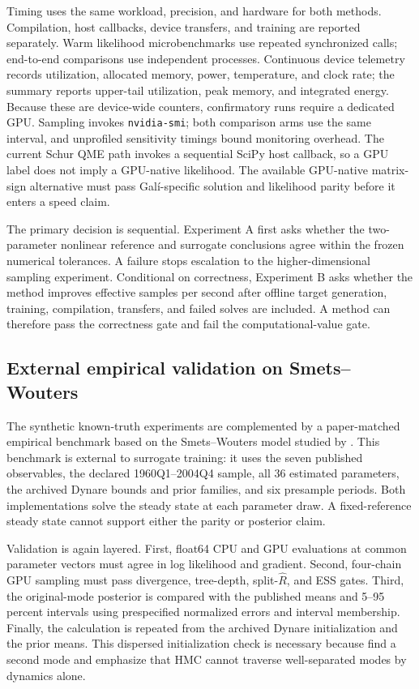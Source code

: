 \documentclass[11pt]{article}
\begin{document}
Timing uses the same workload, precision, and hardware for both methods.
Compilation, host callbacks, device transfers, and training are reported
separately. Warm likelihood microbenchmarks use repeated synchronized calls;
end-to-end comparisons use independent processes. Continuous device telemetry
records utilization, allocated memory, power, temperature, and clock rate; the
summary reports upper-tail utilization, peak memory, and integrated energy.
Because these are device-wide counters, confirmatory runs require a dedicated
GPU. Sampling invokes \texttt{nvidia-smi}; both comparison arms use the same
interval, and unprofiled sensitivity timings bound monitoring overhead. The
current Schur QME path
invokes a sequential SciPy host callback, so a GPU label does not imply a
GPU-native likelihood. The available GPU-native matrix-sign alternative must
pass Gal\'i-specific solution and likelihood parity before it enters a speed
claim.

The primary decision is sequential. Experiment A first asks whether the
two-parameter nonlinear reference and surrogate conclusions agree within the
frozen numerical tolerances. A failure stops escalation to the higher-dimensional
sampling experiment. Conditional on correctness, Experiment B asks whether the
method improves effective samples per second after offline target generation,
training, compilation, transfers, and failed solves are included. A method can
therefore pass the correctness gate and fail the computational-value gate.

\subsection{External empirical validation on Smets--Wouters}

The synthetic known-truth experiments are complemented by a paper-matched
empirical benchmark based on the Smets--Wouters model studied by
\citet{farkastatar2023}. This benchmark is external to surrogate training: it
uses the seven published observables, the declared 1960Q1--2004Q4 sample, all 36
estimated parameters, the archived Dynare bounds and prior families, and six
presample periods. Both implementations solve the steady state at each
parameter draw. A fixed-reference steady state cannot support either the
parity or posterior claim.

Validation is again layered. First, float64 CPU and GPU evaluations at common
parameter vectors must agree in log likelihood and gradient. Second, four-chain
GPU sampling must pass divergence, tree-depth, split-$\widehat R$, and ESS
gates. Third, the original-mode posterior is compared with the published means
and 5--95 percent intervals using prespecified normalized errors and interval
membership. Finally, the calculation is repeated from the archived Dynare
initialization and the prior means. This dispersed initialization check is
necessary because \citet{farkastatar2023} find a second mode and emphasize that
HMC cannot traverse well-separated modes by dynamics alone.
\end{document}
